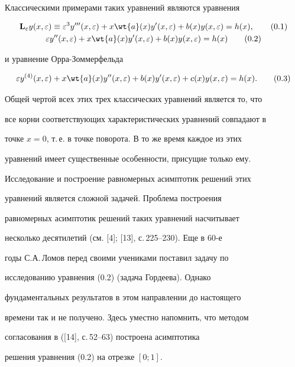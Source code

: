 Классическими примерами таких уравнений являются уравнения


\begin{gather}


\bold{L}_{\e} y (x, \e) \equiv \e^3 y''' (x, \e) +x \wt{a}


(x) y' (x, \e) + b(x) y(x, \e) = h (x), \tag{0.1} \\


%


\e y'' (x, \e) + x \wt{a} (x) y' (x, \e) + b(x) y (x, \e) =h(x) \tag{0.2}


\end{gather}


и уравнение Орра-Зоммерфельда


\begin{equation}


\e y^{(4)} (x, \e) + x \wt{a} (x) y'' (x, \e) + b(x) y' (x, \e)


+ c(x) y(x, \e) = h(x).\tag{0.3}


\end{equation}


Общей чертой всех этих трех классических уравнений является то, что


все корни соответствующих характеристических уравнений совпадают в


точке $x=0$, т.\,е. в точке поворота. В то же время каждое из этих


уравнений имеет существенные особенности, присущие только ему.


Исследование и построение равномерных асимптотик решений этих


уравнений является сложной задачей. Проблема построения


равномерных асимптотик решений таких уравнений насчитывает


несколько десятилетий (см. [4]; [13], с.\,225--230). Еще в 60-е


годы С.А.\,Ломов перед своими учениками поставил задачу по


исследованию уравнения (0.2) (задача Гордеева). Однако


фундаментальных результатов в этом направлении до настоящего


времени так и не получено. Здесь уместно напомнить, что методом


согласования в ([14], с.\,52--63) построена асимптотика


решения уравнения (0.2) на отрезке $[0; 1]$.





